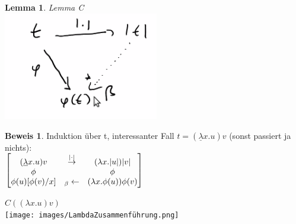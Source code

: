 \documentclass{article}
\newtheorem{lemma}{Lemma}[section]
\theoremstyle{definition}
\newtheorem{beweis}{Beweis}[section]
\begin{document}
	\begin{lemma} Lemma C\\
	\includegraphics[width=256px]{images/LemmaC.png}\\
	\end{lemma}
	\begin{beweis} Induktion über t, interessanter Fall $t=(\underline{\lambda}x.u)v$ (sonst passiert ja nichts):\\
	$\begin{bmatrix}(\underline{\lambda}x.u)v&\stackrel{|\cdot|}{\to}& (\lambda x.|u| )|v|\\
	\phi & &\phi\\
	\phi(u)[\phi(v)/x]&_\beta\leftarrow&(\lambda x.\phi(u))\phi(v)
	\end{bmatrix}$
	\end{beweis}
	$C((\lambda x.u)v)$\\
	\texttt{[image: images/LambdaZusammenführung.png]}\\
\end{document}
